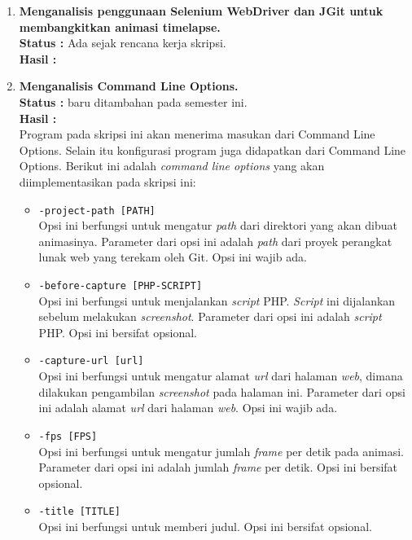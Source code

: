 \documentclass[a4paper,twoside]{article}
\begin{document}
\begin{enumerate}
\begin{enumerate}
\end{enumerate}
 

		\item \textbf{Menganalisis penggunaan Selenium WebDriver dan JGit untuk membangkitkan animasi timelapse.}\\
		{\bf Status :} Ada sejak rencana kerja skripsi.\\
		{\bf Hasil :}
		
		\item \textbf{Menganalisis Command Line Options.}\\
		{\bf Status :} baru ditambahan pada semester ini.\\
		{\bf Hasil :}\\
		Program pada skripsi ini akan menerima masukan dari Command Line Options. Selain itu konfigurasi program juga didapatkan dari Command Line Options. Berikut ini adalah \textit{command line options} yang akan diimplementasikan pada skripsi ini:
\begin{itemize}
\item \texttt{-project-path [PATH]}\\
Opsi ini berfungsi untuk mengatur \textit{path} dari direktori yang akan dibuat animasinya. Parameter dari opsi ini adalah \textit{path} dari proyek perangkat lunak web yang terekam oleh Git. Opsi ini wajib ada.

\item \texttt{-before-capture [PHP-SCRIPT]}\\
Opsi ini berfungsi untuk menjalankan \textit{script} PHP. \textit{Script} ini dijalankan sebelum melakukan \textit{screenshot}. Parameter dari opsi ini adalah \textit{script} PHP. Opsi ini bersifat opsional.

\item \texttt{-capture-url [url]}\\
Opsi ini berfungsi untuk mengatur alamat \textit{url} dari halaman \textit{web}, dimana dilakukan pengambilan \textit{screenshot} pada halaman ini. Parameter dari opsi ini adalah alamat \textit{url} dari halaman \textit{web}. Opsi ini wajib ada.

\item \texttt{-fps [FPS]}\\
Opsi ini berfungsi untuk mengatur jumlah \textit{frame} per detik pada animasi.  Parameter dari opsi ini adalah jumlah \textit{frame} per detik. Opsi ini bersifat opsional.

\item \texttt{-title [TITLE]}\\
Opsi ini berfungsi untuk memberi judul. Opsi ini bersifat opsional. 


\end{itemize}
\end{enumerate}
\end{document}
